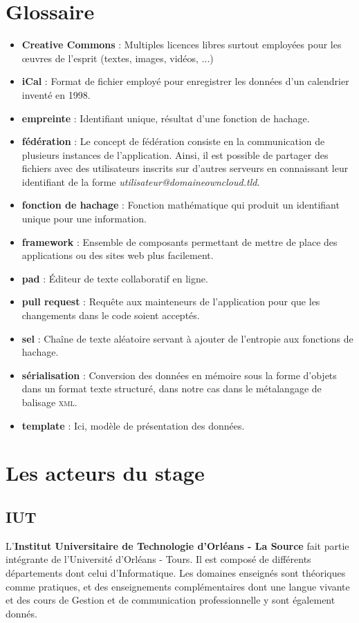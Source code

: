 \documentclass[10pt,a4paper, twoside]{report}
\newcommand{\mychapter}[2]{
	\setcounter{chapter}{#1}
	\setcounter{section}{0}
	\chapter*{#2}
	\addcontentsline{toc}{chapter}{#2}
}
\begin{document}
	\mychapter{0}{Glossaire}
	\begin{itemize}
		\item \textbf{Creative Commons} : Multiples licences libres surtout employées pour les œuvres de l'esprit (textes, images, vidéos, ...)
		\item \textbf{iCal} : Format de fichier employé pour enregistrer les données d'un calendrier inventé en 1998.
		\item \textbf{empreinte} : Identifiant unique, résultat d'une fonction de hachage.
		\item \textbf{fédération} : Le concept de fédération consiste en la communication de plusieurs instances de l'application. Ainsi, il est possible de partager des fichiers avec des utilisateurs inscrits sur d'autres serveurs en connaissant leur identifiant de la forme \textit{utilisateur@domaineowncloud.tld}.
		\item \textbf{fonction de hachage} : Fonction mathématique qui produit un identifiant unique pour une information.
		\item \textbf{framework} : Ensemble de composants permettant de mettre de place des applications ou des sites web plus facilement.
		\item \textbf{pad} : Éditeur de texte collaboratif en ligne.
		\item \textbf{pull request} : Requête aux mainteneurs de l'application pour que les changements dans le code soient acceptés.
		\item \textbf{sel} : Chaîne de texte aléatoire servant à ajouter de l'entropie aux fonctions de hachage.
		\item \textbf{sérialisation} : Conversion des données en mémoire sous la forme d'objets dans un format texte structuré, dans notre cas dans le métalangage de balisage \textsc{xml}.
		\item \textbf{template} : Ici, modèle de présentation des données.
	\end{itemize}
	
	\chapter{Les acteurs du stage}
	\section{IUT}
	L'\textbf{Institut Universitaire de Technologie d'Orléans - La Source} fait partie intégrante de l'Université d'Orléans - Tours. Il est composé de différents départements dont celui d'Informatique. Les domaines enseignés sont théoriques comme pratiques, et des enseignements complémentaires dont une langue vivante et des cours de Gestion et de communication professionnelle y sont également donnés.
	
\end{document}
